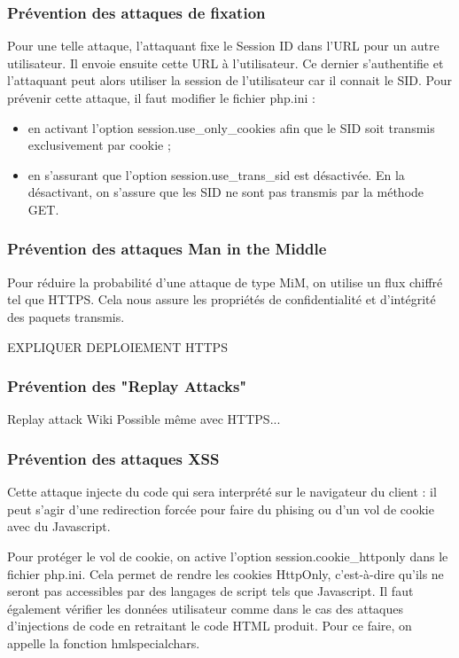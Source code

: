 \documentclass[a4paper]{article}
\begin{document}
\subsubsection{Prévention des attaques de fixation}
Pour une telle attaque, l'attaquant fixe le Session ID dans l'URL pour
un autre utilisateur. Il envoie ensuite cette URL à l'utilisateur. Ce
dernier s'authentifie et l'attaquant peut alors utiliser la session de
l'utilisateur car il connait le SID. Pour prévenir cette attaque, il faut
modifier le fichier php.ini :

\begin{itemize}
	\item en activant l'option session.use\_only\_cookies afin que
		le SID soit transmis exclusivement par cookie ;
	\item en s'assurant que l'option session.use\_trans\_sid est désactivée. 
	En la désactivant, on s'assure que les SID ne sont pas transmis par la méthode GET.
\end{itemize}

\subsubsection{Prévention des attaques Man in the Middle}
Pour réduire la probabilité d'une attaque de type MiM, on utilise un flux
chiffré tel que HTTPS. Cela nous assure les propriétés de confidentialité
et d'intégrité des paquets transmis.

EXPLIQUER DEPLOIEMENT HTTPS

\subsubsection{Prévention des "Replay Attacks"}

		Replay attack Wiki
		Possible même avec HTTPS...
 		
\subsubsection{Prévention des attaques XSS}
 		
Cette attaque injecte du code qui sera interprété sur le navigateur
du client : il peut s'agir d'une redirection forcée pour faire  du phising
ou d'un vol de cookie avec du Javascript.

Pour protéger le vol de cookie, on active l'option session.cookie\_httponly
dans le fichier php.ini. Cela permet de rendre les cookies HttpOnly,
c'est-à-dire qu'ils ne seront pas accessibles par des langages de script
tels que Javascript. Il faut également vérifier les données utilisateur
comme dans le cas des attaques d'injections de code en retraitant le code
HTML produit. Pour ce faire, on appelle la fonction hmlspecialchars.
 		
\end{document}
